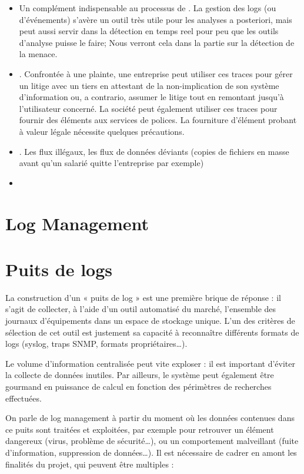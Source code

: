  
 \begin{itemize}

   \item Un complément indispensable au processus de . La gestion des logs (ou d’événements) s’avère un outil très utile pour les analyses a posteriori, mais peut aussi servir dans la détection en temps reel pour peu que les outils d'analyse puisse le faire; Nous verront cela dans la partie sur la détection de la menace.


   \item  {}. Confrontée à une plainte, une entreprise peut utiliser ces traces pour gérer un litige avec un tiers  en attestant de la non-implication de son système d’information ou, a contrario, assumer le litige tout en remontant jusqu’à l’utilisateur concerné. La société peut également utiliser ces traces pour fournir des éléments aux services de polices. La fourniture d'élément probant à valeur légale nécessite quelques précautions. 


   \item  {}. Les flux illégaux, les flux de données déviants (copies de fichiers en masse avant qu'un salarié quitte l'entreprise par exemple)
 
   \item 
\end{itemize}

 

\section{Log Management}


\section{Puits de logs}

La construction d’un « puits de log » est une première brique de réponse : il s’agit de collecter, à l’aide d’un outil automatisé du marché, l’ensemble des journaux d’équipements dans un espace de stockage unique. L’un des critères de sélection de cet outil est justement sa capacité à reconnaître différents formats de logs (syslog, traps SNMP, formats propriétaires…).

Le volume d’information centralisée peut vite exploser : il est important d’éviter la collecte de données inutiles. Par ailleurs, le système peut également être gourmand en puissance de calcul en fonction des périmètres de recherches effectuées.

On parle de log management à partir du moment où les données contenues dans ce puits sont traitées et exploitées, par exemple pour retrouver un élément dangereux (virus, problème de sécurité…), ou un comportement malveillant (fuite d’information, suppression de données…). Il est nécessaire de cadrer en amont les finalités du projet,  qui peuvent être multiples :